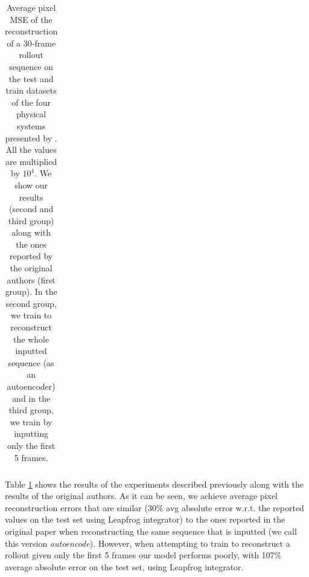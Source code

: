 \begin{table}[]
{\begin{tabular}{c c c c c c c c c}
    \end{tabular}}
    \vspace{0.25cm}
    \caption{Average pixel MSE of the reconstruction of a 30-frame rollout sequence on the test and train datasets of the four physical systems presented by \cite{hgn}. All the values are multiplied by $10^4$. We show our results (second and third group) along with the ones reported by the original authors (first group). In the second group, we train to reconstruct the whole inputted sequence (as an autoencoder) and in the third group, we train by inputting only the first 5 frames.}
    \label{tab:reproduction}
\end{table}

Table \ref{tab:reproduction} shows the results of the experiments described previously along with the results of the original authors. As it can be seen, we achieve average pixel reconstruction errors that are similar (30\% avg absolute error w.r.t. the reported values on the test set using Leapfrog integrator) to the ones reported in the original paper when reconstructing the same sequence that is inputted (we call this version \textit{autoencode}).
However, when attempting to train to reconstruct a rollout given only the first 5 frames our model performs poorly, with 107\% average absolute error on the test set, using Leapfrog integrator.

